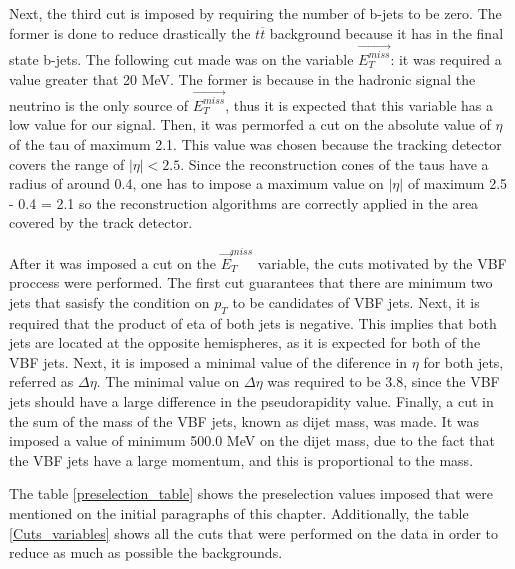 Next, the third cut is imposed by requiring the number of b-jets to be zero. The former is done to reduce drastically the $t\overline{t}$ background because it has in the final state b-jets. The 
following cut made was on the variable $\vec{E_T^{miss}}$: it was required a value greater that 20 MeV. The former is because in the hadronic signal the neutrino is the only source of 
$\vec{E_T^{miss}}$, thus it is expected that this variable has a low value for our signal. Then, it was permorfed a cut on the absolute value of $\eta$ of the tau of maximum 2.1. This value was 
chosen because the tracking detector covers the range of $|\eta|<2.5$. Since the reconstruction cones of the taus have a radius of around 0.4, one has to impose a maximum value on $|\eta|$ of 
maximum 2.5 - 0.4 = 2.1 so the reconstruction algorithms are correctly applied in the area covered by the track detector.
  
After it was imposed a cut on the $\vec{E}_T^{miss}$ variable, the cuts motivated by the VBF proccess were performed. The first cut guarantees that there are minimum two jets that sasisfy the 
condition on $p_T$ to be candidates of VBF jets. Next, it is required that the product of eta of both jets is negative. This implies that both jets are located at the opposite hemispheres,
as it is expected for both of the VBF jets. Next, it is imposed a minimal value of the diference in $\eta$ for both jets, referred as $\Delta \eta$. The minimal value on $\Delta \eta$ was required 
to be 3.8, since the VBF jets should have a large difference in the pseudorapidity value. Finally, a cut in the sum of the mass of the VBF jets, known as dijet mass, was made. It was imposed a 
value of minimum 500.0 MeV on the dijet mass, due to the fact that the VBF jets have a large momentum, and this is proportional to the mass.  

The table \ref{preselection_table} shows the preselection values imposed that were mentioned on the initial paragraphs of this chapter. Additionally, the table \ref{Cuts_variables} shows all 
the cuts that were performed on the data in order to reduce as much as possible the backgrounds. 

